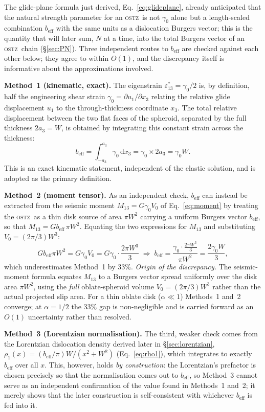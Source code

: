 \documentclass[5p,sort&compress]{elsarticle}
\newcommand{\OSTZ}{\textsc{ostz}}
\newcommand{\gz}{\gamma_0}
\newcommand{\beff}{b_\mathrm{eff}}
\begin{document}
The glide-plane formula just derived, Eq.~\eqref{eq:glideplane},
already anticipated that the natural strength parameter for an
\OSTZ\ is not $\gz$ alone but a length-scaled combination $\beff$
with the same units as a dislocation Burgers vector; this is the
quantity that will later sum, $N$ at a time, into the total Burgers
vector of an \OSTZ\ chain (\S\ref{sec:PN}). Three independent routes
to $\beff$ are checked against each other below; they agree to
within $O(1)$, and the discrepancy itself is informative about the
approximations involved.

\textbf{Method~1 (kinematic, exact).} The eigenstrain
$\varepsilon^*_{13}=\gz/2$ is, by definition, half the engineering
shear strain $\gz=\partial u_1/\partial x_3$ relating the relative
glide displacement $u_1$ to the through-thickness coordinate $x_3$.
The total relative displacement between the two flat faces of the
spheroid, separated by the full thickness $2a_3=W$, is obtained by
integrating this constant strain across the thickness:
\[
  \beff=\int_{-a_3}^{a_3}\gz\,\mathrm dx_3=\gz\times2a_3=\gz W.
\]
This is an exact kinematic statement, independent of the elastic
solution, and is adopted as the primary definition.

\textbf{Method~2 (moment tensor).} As an independent check, $\beff$
can instead be extracted from the seismic moment $M_{13}=G\gz V_0$
of Eq.~\eqref{eq:moment} by treating the \OSTZ\ as a thin disk source
of area $\pi W^2$ carrying a uniform Burgers vector $\beff$, so that
$M_{13}=G\beff\,\pi W^2$. Equating the two expressions for $M_{13}$
and substituting $V_0=(2\pi/3)W^3$:
\[
  G\beff\pi W^2=G\gz V_0=G\gz\cdot\frac{2\pi W^3}{3}
  \;\Rightarrow\;
  \beff=\frac{\gz\cdot\frac{2\pi W^3}{3}}{\pi W^2}=\frac{2\gz W}{3},
\]
which underestimates Method~1 by 33\%.
\textit{Origin of the discrepancy.} The seismic-moment formula
equates $M_{13}$ to a Burgers vector spread uniformly over the disk
area $\pi W^2$, using the \emph{full} oblate-spheroid volume
$V_0=(2\pi/3)W^3$ rather than the actual projected slip area. For a
thin oblate disk ($\alpha\ll1$) Methods~1 and~2 converge; at
$\alpha=1/2$ the 33\% gap is non-negligible and is carried forward
as an $O(1)$ uncertainty rather than resolved.

\textbf{Method~3 (Lorentzian normalisation).} The third, weaker check
comes from the Lorentzian dislocation density derived later in
\S\ref{sec:lorentzian}, $\rho_1(x)=(\beff/\pi)W/(x^2+W^2)$
(Eq.~\eqref{eq:rho1}), which integrates to exactly $\beff$ over all
$x$. This, however, holds \emph{by construction}: the Lorentzian's
prefactor is chosen precisely so that the normalisation comes out to
$\beff$, so Method~3 cannot serve as an independent confirmation of
the value found in Methods~1 and~2; it merely shows that the
later construction is self-consistent with whichever $\beff$ is fed
into it.
\end{document}
